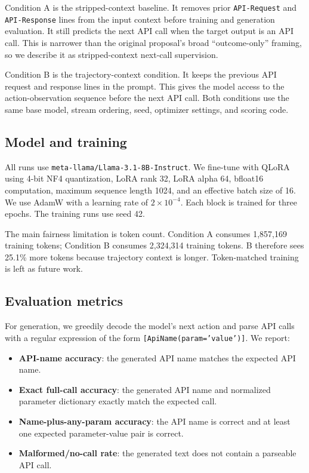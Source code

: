 \documentclass{article}
\begin{document}
Condition A is the stripped-context baseline. It removes prior \texttt{API-Request} and \texttt{API-Response} lines from the input context before training and generation evaluation. It still predicts the next API call when the target output is an API call. This is narrower than the original proposal's broad ``outcome-only'' framing, so we describe it as stripped-context next-call supervision.

Condition B is the trajectory-context condition. It keeps the previous API request and response lines in the prompt. This gives the model access to the action-observation sequence before the next API call. Both conditions use the same base model, stream ordering, seed, optimizer settings, and scoring code.

\subsection{Model and training}

All runs use \texttt{meta-llama/Llama-3.1-8B-Instruct}. We fine-tune with QLoRA using 4-bit NF4 quantization, LoRA rank 32, LoRA alpha 64, bfloat16 computation, maximum sequence length 1024, and an effective batch size of 16. We use AdamW with a learning rate of $2 \times 10^{-4}$. Each block is trained for three epochs. The training runs use seed 42.

The main fairness limitation is token count. Condition A consumes 1,857,169 training tokens; Condition B consumes 2,324,314 training tokens. B therefore sees 25.1\% more tokens because trajectory context is longer. Token-matched training is left as future work.

\subsection{Evaluation metrics}

For generation, we greedily decode the model's next action and parse API calls with a regular expression of the form \texttt{[ApiName(param='value')]}. We report:
\begin{itemize}[leftmargin=*]
    \item \textbf{API-name accuracy}: the generated API name matches the expected API name.
    \item \textbf{Exact full-call accuracy}: the generated API name and normalized parameter dictionary exactly match the expected call.
    \item \textbf{Name-plus-any-param accuracy}: the API name is correct and at least one expected parameter-value pair is correct.
    \item \textbf{Malformed/no-call rate}: the generated text does not contain a parseable API call.
\end{itemize}
\end{document}
